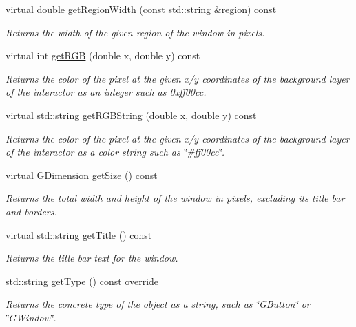 \begin{DoxyCompactItemize}
virtual double \mbox{\hyperlink{classGWindow_ab169dab454fc90f1c845b91b4e1a8a14}{get\+Region\+Width}} (const std\+::string \&region) const
\begin{DoxyCompactList}\small\item\em Returns the width of the given region of the window in pixels. \end{DoxyCompactList}\item 
virtual int \mbox{\hyperlink{classGDrawingSurface_a9e983467cf0c97cfd62433a8471570dc}{get\+R\+GB}} (double x, double y) const
\begin{DoxyCompactList}\small\item\em Returns the color of the pixel at the given x/y coordinates of the background layer of the interactor as an integer such as 0xff00cc. \end{DoxyCompactList}\item 
virtual std\+::string \mbox{\hyperlink{classGDrawingSurface_a456d3582acc3544f37d939f5cb8802fe}{get\+R\+G\+B\+String}} (double x, double y) const
\begin{DoxyCompactList}\small\item\em Returns the color of the pixel at the given x/y coordinates of the background layer of the interactor as a color string such as \char`\"{}\#ff00cc\char`\"{}. \end{DoxyCompactList}\item 
virtual \mbox{\hyperlink{structGDimension}{G\+Dimension}} \mbox{\hyperlink{classGWindow_a7b4eec96a2bdc6420695d5796a78eea9}{get\+Size}} () const
\begin{DoxyCompactList}\small\item\em Returns the total width and height of the window in pixels, excluding its title bar and borders. \end{DoxyCompactList}\item 
virtual std\+::string \mbox{\hyperlink{classGWindow_abc7651e67987c4682fed77d92a860bba}{get\+Title}} () const
\begin{DoxyCompactList}\small\item\em Returns the title bar text for the window. \end{DoxyCompactList}\item 
std\+::string \mbox{\hyperlink{classGWindow_a9b72ede4ee8520f987a0c01e30654814}{get\+Type}} () const override
\begin{DoxyCompactList}\small\item\em Returns the concrete type of the object as a string, such as {\ttfamily \char`\"{}\+G\+Button\char`\"{}} or {\ttfamily \char`\"{}\+G\+Window\char`\"{}}. \end{DoxyCompactList}\item 

\end{DoxyCompactItemize}

